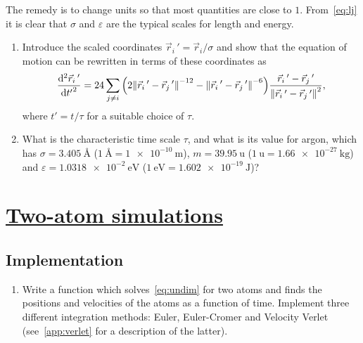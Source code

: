 \documentclass[11pt,british,a4paper]{report}
\begin{document}
The remedy is to change units so that most quantities are close to \(1\). From~\vref{eq:lj} it is clear that \(\sigma\) and \(\varepsilon\) are the typical scales for length and energy.

\begin{enumerate}[label=\roman*.]
    \item Introduce the scaled coordinates \(\vec{r}_i\,'=\vec{r}_i/\sigma\) and show that the equation of motion can be rewritten in terms of these coordinates as
    \begin{equation}
        \dv[2]{\vec{r}_i\,'}{{t'}} = 24 \sum_{j \neq i} \qty(2\norm{\vec{r}_i\,'-\vec{r}_j\,'}^{-12}-\norm{\vec{r}_i\,'-\vec{r}_j\,'}^{-6})\frac{\vec{r}_i\,'-\vec{r}_j\,'}{\norm{\vec{r}_i\,'-\vec{r}_j\,'}^2},\label{eq:undim}
    \end{equation}
    where \(t'=t/\tau\) for a suitable choice of \(\tau\).
    \item What is the characteristic time scale \(\tau\), and what is its value for argon, which has \(\sigma=\SI{3.405}{\angstrom}\) (\(\SI{1}{\angstrom}=\SI{1e-10}{\m}\)), \(m = \SI{39.95}{\atomicmassunit}\) (\(\SI{1}{\atomicmassunit} = \SI{1.66e-27}{\kg}\)) and \(\varepsilon=\SI{1.0318e-2}{\eV}\) (\(\SI{1}{\eV}=\SI{1.602e-19}{\J}\))?
\end{enumerate}



\section{\underline{Two-atom simulations}}

\subsection{Implementation}
\begin{enumerate}[label=\roman*.]
    \item Write a function which solves~\vref{eq:undim} for two atoms and finds the positions and velocities of the atoms as a function of time. Implement three different integration methods:
        Euler, Euler-Cromer and Velocity Verlet (see~\vref{app:verlet} for a description of the latter).
\end{enumerate}
\end{document}
